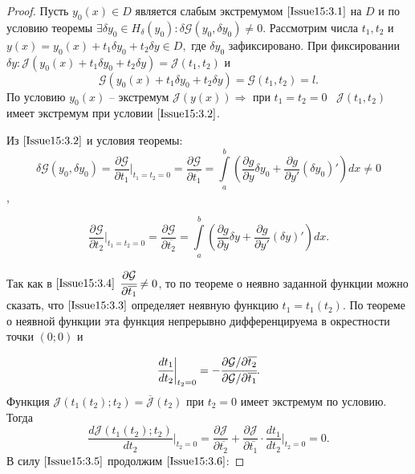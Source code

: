 \begin{proof}
	Пусть $y_0(x)\in D$ является слабым экстремумом $\eqref{Issue15:3.1}$ на $D$ и по условию теоремы $\exists \delta y_0\in H_\delta(y_0): \delta\mathcal{G}(y_0,\delta y_0)\neq 0$. Рассмотрим числа $t_1, t_2$ и $y(x)=y_0(x)+t_1\delta y_0 + t_2 \delta y \in D,$ где $\delta y_0$ зафиксировано. При фиксировании $\delta y: \mathcal{J}(y_0(x)+t_1\delta y_0+t_2 \delta y)=\mathcal{J}(t_1,t_2)$ и \begin{equation}
		\label{Issue15:3.3}
		\mathcal{G}(y_0(x)+t_1\delta y_0+t_2 \delta y)=\mathcal{G}(t_1,t_2)=l.
	\end{equation}
	По условию $y_0(x)$ -- экстремум $\mathcal{J}(y(x))\Rightarrow$ при $t_1=t_2=0\;\;\;\mathcal{J}(t_1,t_2)$ имеет экстремум при условии $\eqref{Issue15:3.2}$.

Из $\eqref{Issue15:3.2}$ и условия теоремы: 
$$\delta \mathcal{G}(y_0,\delta y_0)=\frac{\partial \mathcal{G}}{\partial t_1} \bigg|_{t_1=t_2=0} = \frac{\partial \mathcal{G}}{\partial\overline{t_1}} = \int\limits_a^b \left( \frac{\partial g}{\partial y}\delta y_0+\frac{\partial g}{\partial y'}(\delta y_0)' \right) dx \neq 0$$,

\begin{equation}
	\frac{\partial \mathcal{G}}{\partial t_2} \bigg|_{t_1 = t_2 = 0} = \frac{\partial \mathcal{G}}{\partial\overline{t_2}} = \int\limits_a^b \left( \frac{\partial g}{\partial y}\delta y+\frac{\partial g}{\partial y'}(\delta y)' \right) dx.
	\label{Issue15:3.4}
\end{equation}

Так как в $\eqref{Issue15:3.4}$ $\cfrac{\partial \mathcal{G}}{\partial \overline{t_1}}\neq 0$, то по теореме о неявно заданной функции можно сказать, что $\eqref{Issue15:3.3}$ определяет неявную функцию $t_1=t_1(t_2)$. По теореме о неявной функции эта функция непрерывно дифференцируема в окрестности точки $(0;0)$ и 

\begin{equation}
    \cfrac{dt_1}{dt_2}\bigg|_{t_2 = 0} = -\cfrac{\partial \mathcal{G}/\partial \overline{t_2}}{\partial \mathcal{G}/\partial \overline{t_1}}.
    \label{Issue15:3.5}
\end{equation}
Функция $\mathcal{J}(t_1(t_2);t_2)=\overline{\mathcal{J}}(t_2)$ при $t_2=0$ имеет экстремум по условию. Тогда 
\begin{equation}
    \frac{d\mathcal{J}(t_1(t_2);t_2)}{dt_2} \bigg|_{t_2=0}=\frac{\partial \mathcal{J}}{\partial \overline{t_2}}+ \frac{\partial \mathcal{J}}{\partial \overline{t_1}}\cdot \frac{d t_1}{d t_2}\bigg|_{t_2=0}=0.
    \label{Issue15:3.6}
\end{equation}
В силу $\eqref{Issue15:3.5}$ продолжим $\eqref{Issue15:3.6}$: 


\end{proof}
